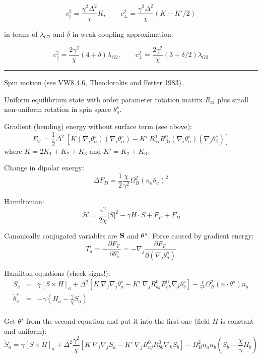 \documentclass[a4paper]{article}
\begin{document}
$$
c_\parallel^2 = \frac{\gamma^2 \Delta^2}{\chi} K,\qquad
c_\perp^2 = \frac{\gamma^2 \Delta^2}{\chi} (K-K'/2)
$$

in terms of $\lambda_{G2}$ and $\delta$ in weak coupling approximation:

$$
c_\parallel^2 = \frac{2\gamma^2}{\chi} (4+\delta)\lambda_{G2},\qquad
c_\perp^2     = \frac{2\gamma^2}{\chi} (3+\delta/2)\lambda_{G2}
$$



\eject
\hrule
\medskip

Spin motion (see VW8.4.6, Theodorakis and Fetter 1983).

Uniform equilibrium state with order parameter rotation matrix $R_{ai}$ plus
small non-uniform rotation in spin space $\theta^s_a$.

Gradient (bending) energy without surface term (see above):
$$
F_\nabla = \frac12 \Delta^2\ [
K (\nabla_i\theta^s_\alpha) (\nabla_i\theta^s_\alpha)
- K'\ R^0_{\alpha i}R^0_{\beta j}(\nabla_i\theta^s_\alpha)(\nabla_j\theta^s_\beta)]
$$
where $K=2K_1+K_2+K_3$ and $K'=K_2+K_3$.

Change in dipolar energy:
$$
\Delta F_D = \frac12 \frac{\chi}{\gamma^2}\Omega_B^2 (n_a \theta_a)^2
$$

Hamiltonian:
$$
\mathcal{H} = \frac{\gamma^2}{2\chi} |S|^2 - \gamma H \cdot S + F_\nabla +  F_D
$$

Canonically conjugated variables are $\bf S$ and ${\bf \theta}^s$. Force
caused by gradient energy:
$$
T_a = -\frac{\partial F_\nabla}{\partial\theta_a^s}
= -\nabla_j \frac{\partial F_\nabla}{\partial(\nabla_j\theta_a^s)}
$$

Hamilton equations (check signs!):
\begin{eqnarray*}
\dot S_a
&=& \gamma [S\times H]_a
 + \Delta^2[K\ \nabla_j\nabla_j \theta_a^s
 - K'\ \nabla_j R^0_{aj} R^0_{bk} \nabla_k\theta_b^s]
- \frac{\chi}{\gamma^2}\Omega_B^2 (n\cdot\theta^s) n_a\\
\dot \theta_a^s &=& -\gamma \left(H_a-\frac{\gamma}{\chi} S_a\right)\\
\end{eqnarray*}

Get $\theta^s$ from the second equation and put it into the first one
(field $H$ is constant and uniform):
$$
\ddot S_a
= \gamma [S\times H]_a
+ \Delta^2\frac{\gamma^2}{\chi}
  [K\ \nabla_j\nabla_j S_a
 - K'\ \nabla_j R^0_{aj}R^0_{bk}\nabla_k  S_b]
- \Omega_B^2 n_a n_b ( S_b -\frac{\chi}{\gamma}H_b)
$$
\end{document}

